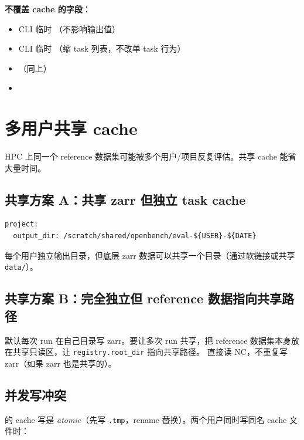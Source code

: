\textbf{不覆盖 cache 的字段}：

\begin{itemize}
  \item CLI 临时 （不影响输出值）
  \item CLI 临时 （缩 task 列表，不改单 task 行为）
  \item {}（同上）
  \item {}
\end{itemize}


\section{多用户共享 cache}

HPC 上同一个 reference 数据集可能被多个用户/项目反复评估。共享 cache 能省大量时间。

\subsection{共享方案 A：共享 zarr 但独立 task cache}

\begin{verbatim}
project:
  output_dir: /scratch/shared/openbench/eval-${USER}-${DATE}
\end{verbatim}

每个用户独立输出目录，但底层 zarr 数据可以共享一个目录（通过软链接或共享 \texttt{data/}）。

\subsection{共享方案 B：完全独立但 reference 数据指向共享路径}

\openbench{} 默认每次 run 在自己目录写 zarr。要让多次 run 共享，把 reference 数据集本身放在共享只读区，让 \texttt{registry.root\_dir} 指向共享路径。\openbench{} 直接读 NC，不重复写 zarr（如果 zarr 也是共享的）。

\subsection{并发写冲突}

\openbench{} 的 cache 写是 \emph{atomic}（先写 \texttt{.tmp}，rename 替换）。两个用户同时写同名 cache 文件时：

